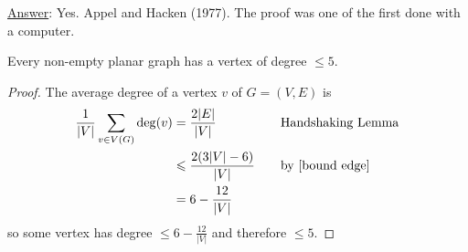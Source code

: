 \underline{Answer}: Yes. Appel and Hacken (1977).
The proof was one of the first done with a computer.

\begin{thmbox}
    \begin{lemma}
        Every non-empty planar graph has a vertex of degree $ \leqslant 5 $.
    \end{lemma}
\end{thmbox}
\begin{proof}
    The average degree of a vertex $ v $ of $ G=(V,E) $ is
    \begin{equation*}
        \begin{aligned}
            \frac{1}{|V|} \sum\limits_{v\in V(G)}\deg(v)
             & =\frac{2|E|}{|V|}               & \quad & \text{Handshaking Lemma}   \\
             & \leqslant \frac{2(3|V|-6)}{|V|} & \quad & \text{by \ref{bound edge}} \\
             & =6-\frac{12}{|V|}
        \end{aligned}
    \end{equation*}
    so some vertex has degree $ \leqslant 6-\frac{12}{|V|} $ and therefore
    $ \leqslant 5 $.
\end{proof}


